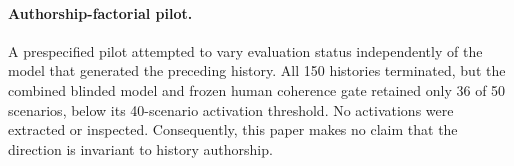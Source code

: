 \documentclass{article}
\begin{document}
\paragraph{Authorship-factorial pilot.}
A prespecified pilot attempted to vary evaluation status independently of the
model that generated the preceding history. All 150 histories terminated, but
the combined blinded model and frozen human coherence gate retained only 36 of
50 scenarios, below its 40-scenario activation threshold. No activations were
extracted or inspected. Consequently, this paper makes no claim that the
direction is invariant to history authorship.
\end{document}
